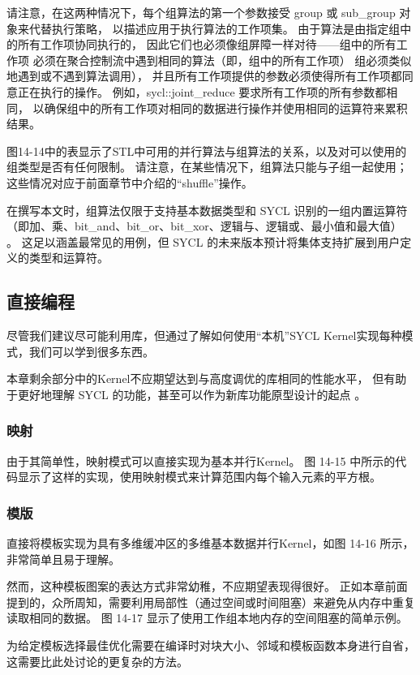请注意，在这两种情况下，每个组算法的第一个参数接受 group 或 sub\_group 对象来代替执行策略，
以描述应用于执行算法的工作项集。 
由于算法是由指定组中的所有工作项协同执行的，
因此它们也必须像组屏障一样对待——组中的所有工作项
必须在聚合控制流中遇到相同的算法（即，组中的所有工作项） 组必须类似地遇到或不遇到算法调用），
并且所有工作项提供的参数必须使得所有工作项都同意正在执行的操作。 
例如，sycl::joint\_reduce 要求所有工作项的所有参数都相同，
以确保组中的所有工作项对相同的数据进行操作并使用相同的运算符来累积结果。

图14-14中的表显示了STL中可用的并行算法与组算法的关系，以及对可以使用的组类型是否有任何限制。 
请注意，在某些情况下，组算法只能与子组一起使用； 这些情况对应于前面章节中介绍的“shuffle”操作。

在撰写本文时，组算法仅限于支持基本数据类型和 SYCL 识别的一组内置运算符
（即加、乘、bit\_and、bit\_or、bit\_xor、逻辑与、逻辑或、最小值和最大值） 。 
这足以涵盖最常见的用例，但 SYCL 的未来版本预计将集体支持扩展到用户定义的类型和运算符。

\subsection{直接编程}
尽管我们建议尽可能利用库，但通过了解如何使用“本机”SYCL Kernel实现每种模式，我们可以学到很多东西。

本章剩余部分中的Kernel不应期望达到与高度调优的库相同的性能水平，
但有助于更好地理解 SYCL 的功能，甚至可以作为新库功能原型设计的起点 。

\subsubsection{映射}
由于其简单性，映射模式可以直接实现为基本并行Kernel。 
图 14-15 中所示的代码显示了这样的实现，使用映射模式来计算范围内每个输入元素的平方根。

\subsubsection{模版}
直接将模板实现为具有多维缓冲区的多维基本数据并行Kernel，如图 14-16 所示，非常简单且易于理解。

然而，这种模板图案的表达方式非常幼稚，不应期望表现得很好。 
正如本章前面提到的，众所周知，需要利用局部性（通过空间或时间阻塞）来避免从内存中重复读取相同的数据。 
图 14-17 显示了使用工作组本地内存的空间阻塞的简单示例。

为给定模板选择最佳优化需要在编译时对块大小、邻域和模板函数本身进行自省，这需要比此处讨论的更复杂的方法。

